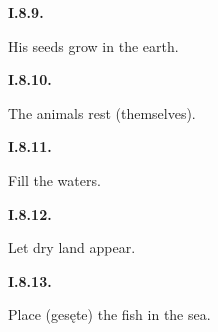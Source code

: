 \par\begin{minipage}{\linewidth}\raggedright
\textbf{I.8.9.}

His seeds grow in the earth.

\end{minipage}\par\addvspace{4pt}

\par\begin{minipage}{\linewidth}\raggedright
\textbf{I.8.10.}

The animals rest (themselves).

\end{minipage}\par\addvspace{4pt}

\par\begin{minipage}{\linewidth}\raggedright
\textbf{I.8.11.}

Fill the waters.

\end{minipage}\par\addvspace{4pt}

\par\begin{minipage}{\linewidth}\raggedright
\textbf{I.8.12.}

Let dry land appear.

\end{minipage}\par\addvspace{4pt}

\par\begin{minipage}{\linewidth}\raggedright
\textbf{I.8.13.}

Place (gesęte) the fish in the sea.

\end{minipage}\par\addvspace{4pt}

